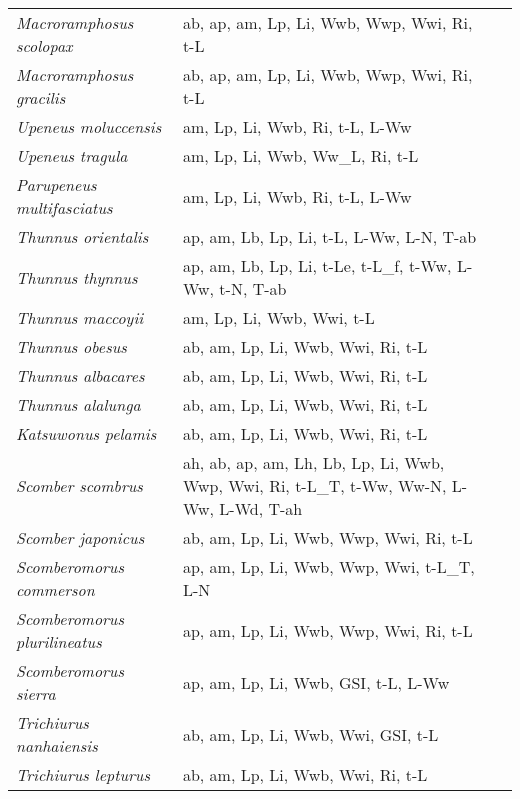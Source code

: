 {\begin{longtable}[c]{p{3.5cm}p{5.5cm}p{5.5cm}}
\emph{Macroramphosus scolopax} &  ab, ap, am, Lp, Li, Wwb, Wwp, Wwi, Ri, t-L & \citet{Borg2000} \\
\emph{Macroramphosus gracilis} &  ab, ap, am, Lp, Li, Wwb, Wwp, Wwi, Ri, t-L & \citet{Borg2000} \\
\emph{Upeneus moluccensis} &  am, Lp, Li, Wwb, Ri, t-L, L-Ww & \citet{KayaBenl1999} \\
\emph{Upeneus tragula} &  am, Lp, Li, Wwb, Ww\_L, Ri, t-L & \citet{PavlHa2015} \\
\emph{Parupeneus multifasciatus} &  am, Lp, Li, Wwb, Ri, t-L, L-Ww & \citet{PavlHa2013} \\
\emph{Thunnus orientalis} &  ap, am, Lb, Lp, Li, t-L, L-Ww, L-N, T-ab & \citet{JusuKlan2011} \\
\emph{Thunnus thynnus} &  ap, am, Lb, Lp, Li, t-Le, t-L\_f, t-Ww, L-Ww, t-N, T-ab & \citet{AguaGarc2005,JusuKlan2011,MiyaTana2001,NisbJusu2012,MiyaTana2000} \\
\emph{Thunnus maccoyii} &  am, Lp, Li, Wwb, Wwi, t-L & \citet{GunnClea2008} \\
\emph{Thunnus obesus} &  ab, am, Lp, Li, Wwb, Wwi, Ri, t-L & \citet{AireMaun2015} \\
\emph{Thunnus albacares} &  ab, am, Lp, Li, Wwb, Wwi, Ri, t-L & \citet{EvesMilli2015} \\
\emph{Thunnus alalunga} &  ab, am, Lp, Li, Wwb, Wwi, Ri, t-L & \citet{ZaraBabc2016} \\
\emph{Katsuwonus pelamis} &  ab, am, Lp, Li, Wwb, Wwi, Ri, t-L & \citet{EvesMilli2015} \\
\emph{Scomber scombrus} &  ah, ab, ap, am, Lh, Lb, Lp, Li, Wwb, Wwp, Wwi, Ri, t-L\_T, t-Ww, Ww-N, L-Ww, L-Wd, T-ah & \citet{MendAlva2006,Lock1988,Damm2007,MendAlva2007} \\
\emph{Scomber japonicus} &  ab, am, Lp, Li, Wwb, Wwp, Wwi, Ri, t-L & \citet{TakaYone2005} \\
\emph{Scomberomorus commerson} &  ap, am, Lp, Li, Wwb, Wwp, Wwi, t-L\_T, L-N & \citet{McIlClae2005,NoegBoer2018} \\
\emph{Scomberomorus plurilineatus} &  ap, am, Lp, Li, Wwb, Wwp, Wwi, Ri, t-L & \citet{ChalGove1999} \\
\emph{Scomberomorus sierra} &  ap, am, Lp, Li, Wwb, GSI, t-L, L-Ww & \citet{ChalGove1999,LucaRuiz2011,NavaEspi2012} \\
\emph{Trichiurus nanhaiensis} &  ab, am, Lp, Li, Wwb, Wwi, GSI, t-L & \citet{KwokNi1999,KwokNi2000} \\
\emph{Trichiurus lepturus} &  ab, am, Lp, Li, Wwb, Wwi, Ri, t-L & \citet{Nara1976} \\

\end{longtable}}
